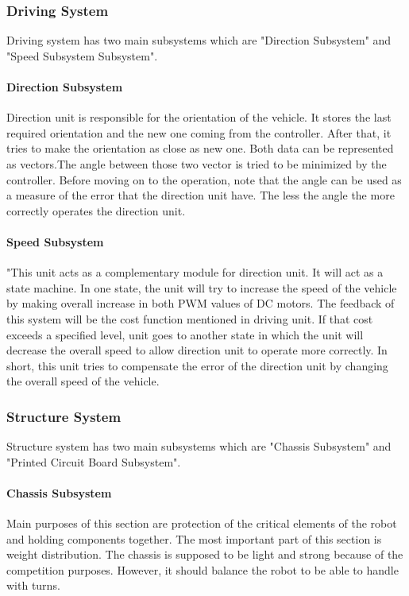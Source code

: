 \documentclass[a4paper,12pt]{article}
\begin{document}
		
	\subsubsection{Driving System}
		
		Driving system has two main subsystems which are "Direction Subsystem" and "Speed Subsystem Subsystem".

		\paragraph{Direction Subsystem}
			Direction unit is responsible for the orientation of the vehicle. It stores the last required orientation and the new one coming from the controller. After that, it tries to make the orientation as close as new one. Both data can be represented as vectors.The angle between those two vector is tried to be minimized by the controller. Before moving on to the operation, note that the angle can be used as a measure of the error that the direction unit have. The less the angle the more correctly operates the direction unit.\\

			
		\paragraph{Speed Subsystem}

		"This unit acts as a complementary module for direction unit. It will act as a state machine. In one state, the unit will try to increase the speed of the vehicle by making overall increase in both PWM values of DC motors. The feedback of this  system will be the cost function mentioned in driving unit. If that cost exceeds a specified level, unit goes to another state in which the unit will decrease the overall speed to allow direction unit to operate more correctly. In short, this unit tries to compensate the error of the direction unit by changing the overall speed of the vehicle.
 

	\subsubsection{Structure System}
	
		Structure system has two main subsystems which are "Chassis Subsystem" and "Printed Circuit Board Subsystem".
		
		\paragraph{Chassis Subsystem}
			Main purposes of this section are protection of the critical elements of the robot and holding components together. The most important part of this section is weight distribution. The chassis is supposed to be light and strong because of the competition purposes. However, it should balance the robot to be able to handle with turns. 
\end{document}
